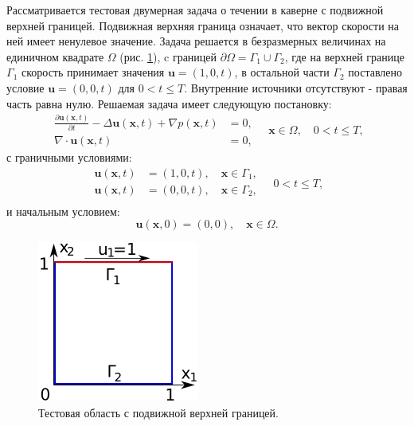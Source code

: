 \documentclass[12pt]{article}
\begin{document}
Рассматривается тестовая двумерная задача о течении в каверне с подвижной верхней границей. Подвижная верхняя граница означает, что вектор скорости на ней имеет ненулевое значение. Задача решается в безразмерных величинах на единичном квадрате $\Omega$ (рис. \ref{fg:cavity}), c границей $\partial \Omega=\Gamma_1 \cup \Gamma_2$, где на верхней границе $\Gamma_1$ скорость принимает значения ${\bm u}=(1, 0, t)$, в остальной части $\Gamma_2$ поставлено условие ${\bm u}=(0, 0, t)$ для $0<t \leq T$. Внутренние источники отсутствуют - правая часть равна нулю. Решаемая задача имеет следующую постановку:
\begin{equation}
\begin{split}
\frac{\partial {\bm u}({\bm x}, t)}{\partial t} -\Delta {\bm u}({\bm x}, t) + \nabla p({\bm x}, t) &= 0, \\
\nabla\cdot{\bm u}({\bm x}, t) &= 0, 
\end{split}
\quad {\bm x} \in \Omega, \quad 0<t \leq T,
\label{eq:scheme-main}
\end{equation} 
с граничными условиями:
\begin{equation}
\begin{split}
{\bm u(\bm x, t)} &= (1, 0, t), \quad {\bm x} \in \Gamma_1,  \\
{\bm u(\bm x, t)} &= (0, 0, t), \quad {\bm x} \in \Gamma_2, \\
\end{split}
\quad 0<t \leq T,
\label{eq:scheme-boundary}
\end{equation} 
и начальным условием:
\begin{equation}
{\bm u(\bm x, 0)} = (0, 0), \quad {\bm x} \in \Omega.
\label{eq:scheme-start}
\end{equation}

\begin{figure}
	\begin{center}
		\includegraphics[width=200px]{pics/cavity400}
		\caption{Тестовая область с подвижной верхней границей.}
		\label{fg:cavity}
	\end{center}
\end{figure}
\end{document}
